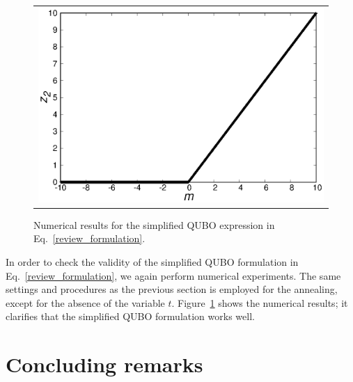 \documentclass[fp,twocolumn]{jpsj3}
\begin{document}
\begin{figure}[tb]
\begin{center}
\begin{tabular}{c}
\begin{minipage}{0.50\hsize}
        \includegraphics[keepaspectratio,scale=0.33]{minimum_z2_non_t.eps}
      \end{minipage}
    \end{tabular}
    \begin{minipage}{0.03\hsize}
      \vspace{2mm}
    \end{minipage}
    \caption{Numerical results for the simplified QUBO expression in Eq.~\eqref{review_formulation}.
    }
    \label{fig:minimum2}
  \end{center}
\end{figure}


In order to check the validity of the simplified QUBO formulation in Eq.~\eqref{review_formulation}, we again perform numerical experiments. 
The same settings and procedures as the previous section is employed for the annealing, except for the absence of the variable $t$.
Figure~\ref{fig:minimum2} shows the numerical results; 
it clarifies that the simplified QUBO formulation works well.


\section{Concluding remarks}

\end{document}
